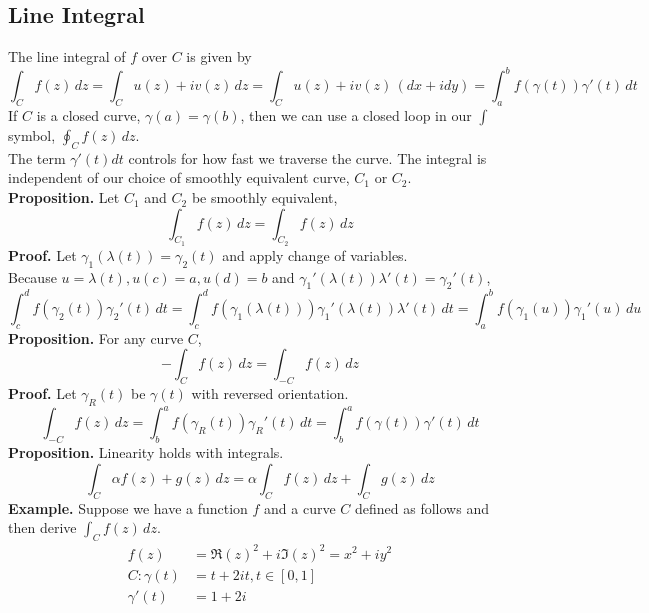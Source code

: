 \documentclass[11pt]{article}
\begin{document}
\subsection{Line Integral}
The line integral of $f$ over $C$ is given by 
$$\int_C f(z) \,dz = \int_C u(z) + iv(z) \,dz = \int_C u(z) + iv(z) \,{(dx + idy)} = \int_{a}^{b} f(\gamma(t))\gamma'(t) \,dt$$
If $C$ is a closed curve, $\gamma(a) = \gamma(b)$, then we can use a closed loop in our $\int$ symbol, $\oint_C f(z) \,dz$. \\
The term $\gamma'(t)dt$ controls for how fast we traverse the curve. The integral is independent of our choice of smoothly equivalent curve, $C_1$ or $C_2$. \\
\newline
\textbf{Proposition.} Let $C_1$ and $C_2$ be smoothly equivalent,
$$\int_{C_1} f(z) \,dz = \int_{C_2} f(z) \,dz$$
\textbf{Proof.} Let $\gamma_1(\lambda(t)) = \gamma_2(t)$ and apply change of variables. \\
Because $u = \lambda(t), u(c) = a, u(d) = b$ and $\gamma_1'(\lambda(t))\lambda'(t) = \gamma_2'(t)$, 
$$\int_{c}^{d} f(\gamma_2(t))\gamma_2'(t)\,dt = \int_{c}^{d}f(\gamma_1(\lambda(t)))\gamma_1'(\lambda(t))\lambda'(t)\,dt = \int_{a}^{b}f(\gamma_1(u))\gamma_1'(u)\,du$$
\textbf{Proposition.} For any curve $C$, 
$$-\int_{C} f(z) \,dz = \int_{-C} f(z) \,dz$$
\textbf{Proof.} Let $\gamma_R(t)$ be $\gamma(t)$ with reversed orientation. 
$$\int_{-C} f(z) \,dz = \int_{b}^{a}f(\gamma_R(t))\gamma_R'(t) \,dt = \int_{b}^{a}f(\gamma(t))\gamma'(t) \,dt$$
\textbf{Proposition.} Linearity holds with integrals. 
$$\int_C \alpha f(z) + g(z) \,dz = \alpha \int_C f(z) \,dz + \int_C g(z) \,dz$$
\textbf{Example.} Suppose we have a function $f$ and a curve $C$ defined as follows and then derive $\int_C f(z) \, dz$. 
\begin{align*}
f(z) &= \Re(z)^2 + i\Im(z)^2 = x^2 + iy^2 \\ 
C: \gamma(t) &= t + 2it, t \in [0, 1] \\
\gamma'(t) &= 1 + 2i
\end{align*}
\end{document}
